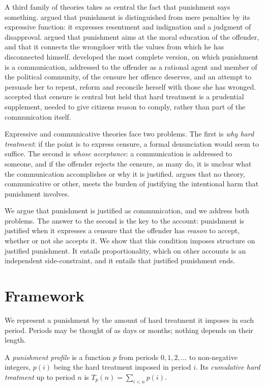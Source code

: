 \documentclass{situationist-preprint}
\begin{document}
A third family of theories takes as central the fact that punishment says something. \citet{Feinberg1965} argued that punishment is distinguished from mere penalties by its expressive function: it expresses resentment and indignation and a judgment of disapproval. \citet{Hampton1984} argued that punishment aims at the moral education of the offender, and \citet{Nozick1981} that it connects the wrongdoer with the values from which he has disconnected himself. \citet{Duff1986,Duff2001} developed the most complete version, on which punishment is a communication, addressed to the offender as a rational agent and member of the political community, of the censure her offence deserves, and an attempt to persuade her to repent, reform and reconcile herself with those she has wronged. \citet{vonHirsch1993} accepted that censure is central but held that hard treatment is a prudential supplement, needed to give citizens reason to comply, rather than part of the communication itself.

Expressive and communicative theories face two problems. The first is \emph{why hard treatment}: if the point is to express censure, a formal denunciation would seem to suffice. The second is \emph{whose acceptance}: a communication is addressed to someone, and if the offender rejects the censure, as many do, it is unclear what the communication accomplishes or why it is justified. \citet{Boonin2008} argues that no theory, communicative or other, meets the burden of justifying the intentional harm that punishment involves.

We argue that punishment is justified as communication, and we address both problems. The answer to the second is the key to the account: punishment is justified when it expresses a censure that the offender has \emph{reason} to accept, whether or not she accepts it. We show that this condition imposes structure on justified punishment. It entails proportionality, which on other accounts is an independent side-constraint, and it entails that justified punishment ends.

\section{Framework}

We represent a punishment by the amount of hard treatment it imposes in each period. Periods may be thought of as days or months; nothing depends on their length.

\begin{definition}[Profile]\label{d:profile}
A \emph{punishment profile} is a function $p$ from periods $0,1,2,\ldots$ to non-negative integers, $p(i)$ being the hard treatment imposed in period $i$. Its \emph{cumulative hard treatment} up to period $n$ is $T_p(n) = \sum_{i<n} p(i)$.
\end{definition}
\end{document}
